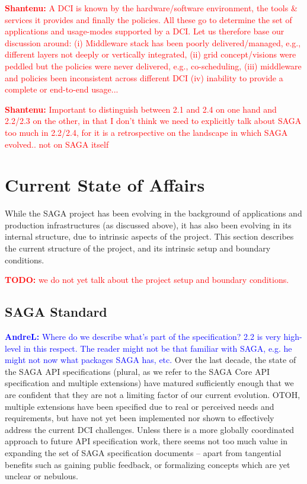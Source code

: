 \documentclass[]{article}
\newcommand{\B}[1]{\textbf{#1}}
\newcommand{\todo}[1]{{\textcolor{red}{\B{TODO:} #1 }}}
\newcommand{\jhanote}[1]{{\textcolor{red}{     \B{Shantenu:} #1 }}}
\newcommand{\alnote}[1]{{\textcolor{blue}{    \B{AndreL:  } #1 }}}
\newcommand{\jhanote}[1]{}
\newcommand{\alnote}[1]{}
\begin{document}
\jhanote{A DCI is known by the hardware/software environment, the
  tools \& services it provides and finally the policies. All these go
  to determine the set of applications and usage-modes supported by a
  DCI. Let us therefore base our discussion around: (i) Middleware
  stack has been poorly delivered/managed, e.g., different layers not
  deeply or vertically integrated, (ii) grid concept/visions were
  peddled but the policies were never delivered, e.g., co-scheduling,
  (iii) middleware and policies been inconsistent across different DCI
  (iv) inability to provide a complete or end-to-end usage...}
  

%

\jhanote{Important to distinguish between 2.1 and 2.4 on one hand and
  2.2/2.3 on the other, in that I don't think we need to explicitly
  talk about SAGA too much in 2.2/2.4, for it is a retrospective on
  the landscape in which SAGA evolved.. not on SAGA itself}

\section{Current State of Affairs}
\label{sec:state}


 While the SAGA project has been evolving in the background of
 applications and production infrastructures (as discussed above), it
 has also been evolving in its internal structure, due to intrinsic
 aspects of the project.  This section describes the current structure
 of the project, and its intrinsic setup and boundary conditions.

 \todo{we do not yet talk about the project setup and boundary
 conditions.}


\subsection{SAGA Standard}
  \alnote{Where do we describe what's part of the specification? 2.2 is very 
  high-level in this respect. The reader might not be that familiar with SAGA,
  e.g. he might not now what packages SAGA has, etc.}
  Over the last decade, the state of the SAGA API specifications
  (plural, as we refer to the SAGA Core API specification and multiple
  extensions) have matured sufficiently enough that we are confident
  that they are not a limiting factor of our current evolution.  OTOH,
  multiple extensions have been specified due to real or perceived
  needs and requirements, but have not yet been implemented nor shown
  to effectively address the current DCI challenges.  Unless there is
  a more globally coordinated approach to future API specification
  work, there seems not too much value in expanding the set of SAGA
  specification documents -- apart from tangential benefits such as
  gaining public feedback, or formalizing concepts which are yet
  unclear or nebulous.
\end{document}
